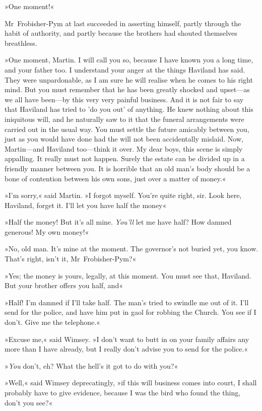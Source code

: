 »One moment!«

Mr~Frobisher-Pym at last succeeded in asserting himself, partly through the habit of authority, and partly because the brothers had shouted themselves breathless.

»One moment, Martin. I will call you so, because I have known you a long time, and your father too. I understand your anger at the things Haviland has said. They were unpardonable, as I am sure he will realise when he comes to his right mind. But you must remember that he has been greatly shocked and upset—as we all have been—by this very very painful business. And it is not fair to say that Haviland has tried to 'do you out' of anything. He knew nothing about this iniquitous will, and he naturally saw to it that the funeral arrangements were carried out in the usual way. You must settle the future amicably between you, just as you would have done had the will not been accidentally mislaid. Now, Martin—and Haviland too—think it over. My dear boys, this scene is simply appalling. It really must not happen. Surely the estate can be divided up in a friendly manner between you. It is horrible that an old man's body should be a bone of contention between his own sons, just over a matter of money.«

»I'm sorry,« said Martin. »I forgot myself. You're quite right, sir. Look here, Haviland, forget it. I'll let you have half the money\longdash«

»Half the money! But it's all mine. \textit{You'll} let me have half? How damned generous! My own money!«

»No, old man. It's mine at the moment. The governor's not buried yet, you know. That's right, isn't it, Mr~Frobisher-Pym?«

»Yes; the money is yours, legally, at this moment. You must see that, Haviland. But your brother offers you half, and\longdash«

»Half! I'm damned if I'll take half. The man's tried to swindle me out of it. I'll send for the police, and have him put in gaol for robbing the Church. You see if I don't. Give me the telephone.«

»Excuse me,« said Wimsey. »I don't want to butt in on your family affairs any more than I have already, but I really don't advise you to send for the police.«

»\textit{You} don't, eh? What the hell's it got to do with you?«

»Well,« said Wimsey deprecatingly, »if this will business comes into court, I shall probably have to give evidence, because I was the bird who found the thing, don't you see?«


